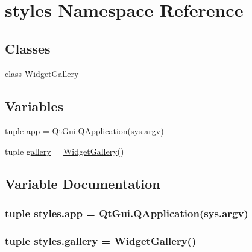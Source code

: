 \hypertarget{namespacestyles}{}\section{styles Namespace Reference}
\label{namespacestyles}
\subsection*{Classes}
\begin{DoxyCompactItemize}
\item 
class \hyperlink{classstyles_1_1WidgetGallery}{Widget\+Gallery}
\end{DoxyCompactItemize}
\subsection*{Variables}
\begin{DoxyCompactItemize}
\item 
tuple \hyperlink{namespacestyles_a0be45b3a977a84ba5d575d84a5248631}{app} = Qt\+Gui.\+Q\+Application(sys.\+argv)
\item 
tuple \hyperlink{namespacestyles_af30c906ac2a77f78288937f595ea76a9}{gallery} = \hyperlink{classstyles_1_1WidgetGallery}{Widget\+Gallery}()
\end{DoxyCompactItemize}


\subsection{Variable Documentation}
\hypertarget{namespacestyles_a0be45b3a977a84ba5d575d84a5248631}{}
\subsubsection[{app}]{\setlength{\rightskip}{0pt plus 5cm}tuple styles.\+app = Qt\+Gui.\+Q\+Application(sys.\+argv)}\label{namespacestyles_a0be45b3a977a84ba5d575d84a5248631}
\hypertarget{namespacestyles_af30c906ac2a77f78288937f595ea76a9}{}
\subsubsection[{gallery}]{\setlength{\rightskip}{0pt plus 5cm}tuple styles.\+gallery = {\bf Widget\+Gallery}()}\label{namespacestyles_af30c906ac2a77f78288937f595ea76a9}
